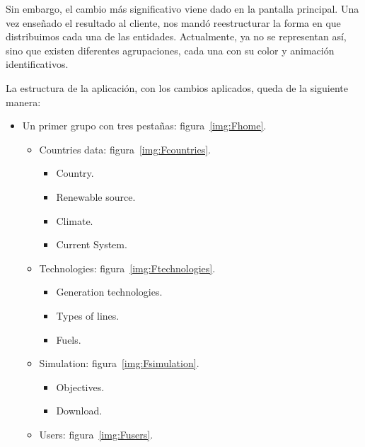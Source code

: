 Sin embargo, el cambio más significativo viene dado en la pantalla principal. Una vez enseñado el resultado al cliente, nos mandó reestructurar la forma en que distribuimos cada una de las entidades. Actualmente, ya no se representan así, sino que existen diferentes agrupaciones, cada una con su color y animación identificativos.

La estructura de la aplicación, con los cambios aplicados, queda de la siguiente manera:

\begin{itemize}
	
	\item Un primer grupo con tres pestañas: figura~\ref{img:Fhome}.
	
	\begin{itemize}
		
		\item Countries data: figura~\ref{img:Fcountries}. 
		
		\begin{itemize}
			
			\item Country.
			\item Renewable source.
			\item Climate.
			\item Current System.
			
		\end{itemize}
		
		\item Technologies: figura~\ref{img:Ftechnologies}.
		
		\begin{itemize}
			
			\item Generation technologies.
			\item Types of lines.
			\item Fuels.
			
		\end{itemize}
		
		\item Simulation: figura~\ref{img:Fsimulation}.
		
		\begin{itemize}
			
			\item Objectives.
			\item Download.
			
		\end{itemize}
	
		\item Users: figura~\ref{img:Fusers}.
		
	\end{itemize}
	
\end{itemize}

